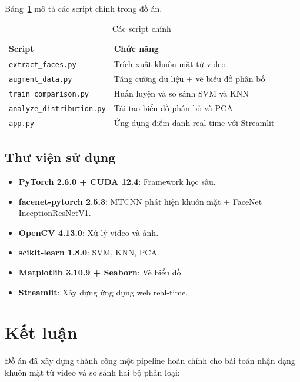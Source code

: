 \documentclass[12pt,a4paper]{article}
\begin{document}
Bảng~\ref{tab:scripts} mô tả các script chính trong đồ án.

\begin{table}[H]
    \centering
    \caption{Các script chính}
    \label{tab:scripts}
    \begin{tabular}{l l}
        \toprule
        \textbf{Script} & \textbf{Chức năng} \\
        \midrule
        \texttt{extract\_faces.py} & Trích xuất khuôn mặt từ video \\
        \texttt{augment\_data.py}  & Tăng cường dữ liệu + vẽ biểu đồ phân bố \\
        \texttt{train\_comparison.py} & Huấn luyện và so sánh SVM và KNN \\
        \texttt{analyze\_distribution.py} & Tái tạo biểu đồ phân bố và PCA \\
        \texttt{app.py}           & Ứng dụng điểm danh real-time với Streamlit \\
        \bottomrule
    \end{tabular}
\end{table}

\subsection{Thư viện sử dụng}
\label{subsec:libraries}

\begin{itemize}
    \item \textbf{PyTorch 2.6.0 + CUDA 12.4}: Framework học sâu.
    \item \textbf{facenet-pytorch 2.5.3}: MTCNN phát hiện khuôn mặt + FaceNet InceptionResNetV1.
    \item \textbf{OpenCV 4.13.0}: Xử lý video và ảnh.
    \item \textbf{scikit-learn 1.8.0}: SVM, KNN, PCA.
    \item \textbf{Matplotlib 3.10.9 + Seaborn}: Vẽ biểu đồ.
    \item \textbf{Streamlit}: Xây dựng ứng dụng web real-time.
\end{itemize}

\section{Kết luận}
\label{sec:conclusion}

Đồ án đã xây dựng thành công một pipeline hoàn chỉnh cho bài toán nhận dạng khuôn mặt từ video và so sánh hai bộ phân loại:
\end{document}
